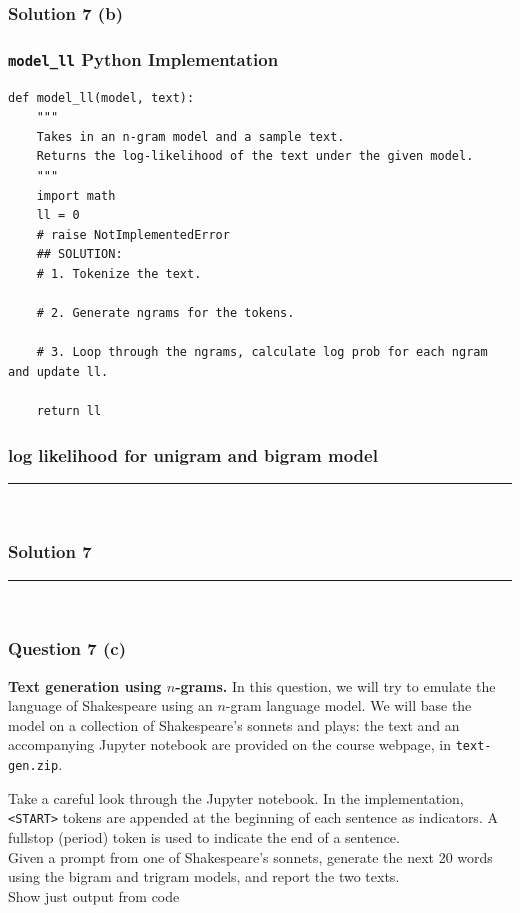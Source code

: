 \documentclass{article}
\begin{document}
\subsubsection*{Solution 7 (b)}

\subsubsection*{\texttt{model\_ll} Python Implementation}

\begin{lstlisting}
def model_ll(model, text):
    """
    Takes in an n-gram model and a sample text.
    Returns the log-likelihood of the text under the given model.
    """
    import math
    ll = 0
    # raise NotImplementedError
    ## SOLUTION:
    # 1. Tokenize the text.

    # 2. Generate ngrams for the tokens.

    # 3. Loop through the ngrams, calculate log prob for each ngram and update ll.
    
    return ll

\end{lstlisting}

\subsubsection*{log likelihood for unigram and bigram model}


\noindent\rule{\textwidth}{0.4pt}\\

\newpage

\subsubsection*{Solution 7}
\noindent\rule{\textwidth}{0.4pt}\\
\subsubsection*{Question 7 (c)}
\begin{flushleft}
 \textbf{Text generation using $n$-grams.} In this question, we will try to emulate the language of Shakespeare using an $n$-gram language model. We will base the model on a collection of Shakespeare's sonnets and plays: the text and an accompanying Jupyter notebook are provided on the course webpage, in \texttt{text-gen.zip}.

Take a careful look through the Jupyter notebook. In the implementation, \texttt{<START>} tokens are appended at the beginning of each sentence as indicators. A fullstop (period) token is used to indicate the end of a sentence.\\
Given a prompt from one of Shakespeare's sonnets, generate the next 20 words using the bigram and trigram models, and report the two texts.\\
Show just output from code
\end{flushleft}
\end{document}
